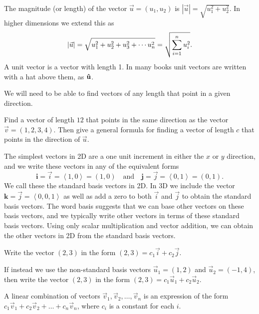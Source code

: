 \begin{definition}
The magnitude (or length) of the vector $\vec u = (u_1,u_2)$ is $|\vec u| = \sqrt{u_1^2+u_2^2}$.  In higher dimensions we extend this as $$\displaystyle |\vec u| = \sqrt{u_1^2+u_2^2+u_3^2+\cdots u_n^2} = \sqrt{\sum_{i=1}^n u_i^2}.$$ 
A unit vector is a vector with length 1. 
In many books unit vectors are written with a hat above them, as $\bf{\hat u}$.
\end{definition}

We will need to be able to find vectors of any length that point in a given direction. 
\begin{problem}
 Find a vector of length $12$ that points in the same direction as the vector $\vec v = (1,2,3,4)$. Then give a general formula for finding a vector of length $c$ that points in the direction of $\vec u$. 
\end{problem}


The simplest vectors in 2D are a one unit increment in either the $x$ or $y$ direction, and we write these vectors in any of the equivalent forms 
$$\textbf{i} = \vec i = \left<1,0\right>=(1,0)\quad \text{and}\quad
  \textbf{j} = \vec j = \left<0,1\right>=(0,1).$$ 
We call these the standard basis vectors in 2D. 
In 3D we include the vector $\textbf{k} = \vec j=\left<0,0,1\right>$ as well as add a zero to both $\vec i$ and $\vec j$ to obtain the standard basis vectors. 
The word basis suggests that we can base other vectors on these basis vectors, and we typically write other vectors in terms of these standard basis vectors. 
Using only scalar multiplication and vector addition, we can obtain the other vectors in 2D from the standard basis vectors. 

\begin{problem}
 Write the vector $(2,3)$ in the form $(2,3) = c_1\vec i+c_2\vec j$.  

If instead we use the non-standard basis vectors $\vec u_1= (1,2)$ and $\vec u_2=(-1,4)$, then write the vector $(2,3)$ 
in the form $(2,3) = c_1\vec u_1+c_2\vec u_2$.
\end{problem}

\begin{definition}
A linear combination of vectors {$\vec v_{1},\vec v_{2},\ldots,\vec v_{n}$} is an expression of the form {$c_1\vec v_{1}+c_2\vec v_{2}+\ldots+c_n\vec v_{n}$}, where {$c_i$} is a constant for each $i$. 
\end{definition}

